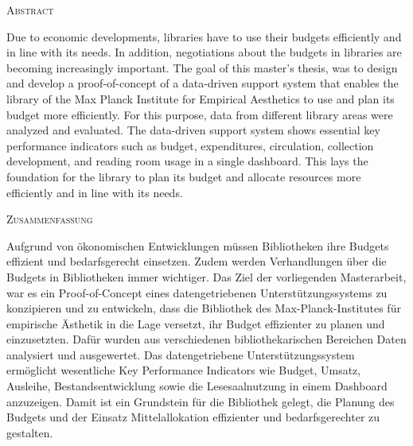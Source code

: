 \begin{center}
    \textsc{Abstract}
  \end{center}
  \noindent
  Due to economic developments, libraries have to use their budgets efficiently and in line with its needs. 
  In addition, negotiations about the budgets in libraries are becoming increasingly important. 
  The goal of this master's thesis, was to design and develop a proof-of-concept of a data-driven support system 
  that enables the library of the Max Planck Institute for Empirical Aesthetics to use and plan its budget more efficiently.
  For this purpose, data from different library areas were analyzed and evaluated. 
  The data-driven support system shows essential key performance indicators such as budget, 
  expenditures, circulation, collection development, and reading room usage in a single dashboard. 
  This lays the foundation for the library to plan its budget and allocate resources more efficiently and in line with its needs.

  

\begin{center}
    \textsc{Zusammenfassung}
  \end{center}

  \noindent
Aufgrund von ökonomischen Entwicklungen müssen Bibliotheken ihre Budgets effizient und bedarfsgerecht einsetzen. 
Zudem werden Verhandlungen über die Budgets in Bibliotheken immer wichtiger. 
Das Ziel der vorliegenden Masterarbeit, war es ein Proof-of-Concept eines datengetriebenen Unterstützungssystems 
zu konzipieren und zu entwickeln, dass die Bibliothek des Max-Planck-Institutes für empirische Ästhetik in die Lage versetzt,
ihr Budget effizienter zu planen und einzusetzten. Dafür wurden aus verschiedenen bibliothekarischen Bereichen Daten analysiert 
und ausgewertet. Das datengetriebene Unterstützungssystem ermöglicht wesentliche Key Performance Indicators wie Budget, 
Umsatz, Ausleihe, Bestandsentwicklung sowie die Lesesaalnutzung in einem Dashboard anzuzeigen. 
Damit ist ein Grundstein für die Bibliothek gelegt, die Planung des Budgets und der Einsatz Mittelallokation effizienter
und bedarfsgerechter zu gestalten.
